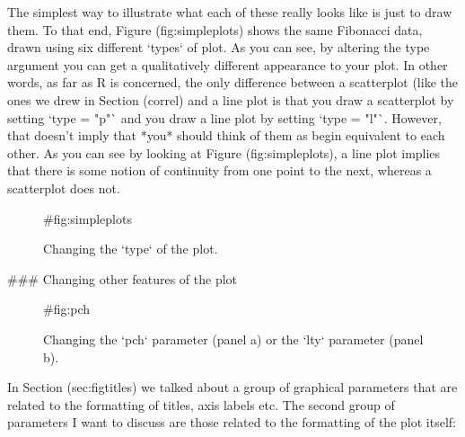 The simplest way to illustrate what each of these really looks like is just to draw them. To that end, Figure \@ref(fig:simpleplots) shows the same Fibonacci data, drawn using six different `types` of plot. As you can see, by altering the type argument you can get a qualitatively different appearance to your plot. In other words, as far as R is concerned, the only difference between a scatterplot (like the ones we drew in Section \@ref(correl)  and a line plot is that you draw a scatterplot by setting `type = "p"` and you draw a line plot by setting `type = "l"`. However, that doesn't imply that *you* should think of them as begin equivalent to each other. As you can see by looking at Figure \@ref(fig:simpleplots), a line plot implies that there is some notion of continuity from one point to the next, whereas a scatterplot does not.


\begin{figure}[t]
\begin{center}
\caption{Changing the `type` of the plot.}
\HR
{#fig:simpleplots}
\end{center}
\end{figure}

### Changing other features of the plot

\begin{figure}[t]
\begin{center}
\caption{Changing the `pch` parameter (panel a) or the `lty` parameter (panel b).}
\HR
{#fig:pch}
\end{center}
\end{figure}

In Section \@ref(sec:figtitles) we talked about a group of graphical parameters that are related to the formatting of titles, axis labels etc. The second group of parameters I want to discuss are those related to the formatting of the plot itself:
 

